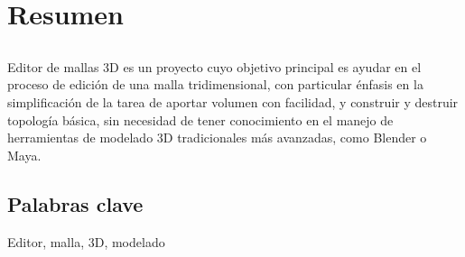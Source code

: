 \chapter*{Resumen}

\section*{\tituloPortadaVal}

Editor de mallas 3D es un proyecto cuyo objetivo principal es ayudar en el proceso de edición de una malla tridimensional, con particular énfasis en la simplificación de la tarea de aportar volumen con facilidad, y construir y destruir topología básica, sin necesidad de tener conocimiento en el manejo de herramientas de modelado 3D tradicionales más avanzadas, como Blender o Maya.

\section*{Palabras clave}
   
\noindent Editor, malla, 3D, modelado

   


